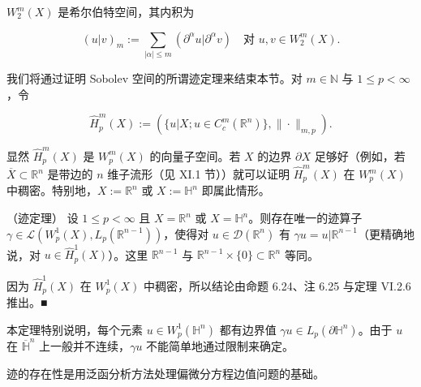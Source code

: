 \begin{corollary}

$ W_2^m(X) $ 是希尔伯特空间，其内积为

\[
(u|v)_m := \sum_{|\alpha|\le m} (\partial^\alpha u|\partial^\alpha v) \quad \text{对 } u, v \in W_2^m(X) .
\]

我们将通过证明 Sobolev 空间的所谓迹定理来结束本节。对 $ m \in \mathbb{N} $ 与 $ 1 \le p < \infty $，令

\[
\widehat{H}_p^m(X) := ( \{ u|X ; u \in C_c^m(\mathbb{R}^n) \}, \|\cdot\|_{m,p} ) .
\]

显然 $ \widehat{H}_p^m(X) $ 是 $ W_p^m(X) $ 的向量子空间。若 $ X $ 的边界 $ \partial X $ 足够好（例如，若 $ \overline{X} \subset \mathbb{R}^n $ 是带边的 $ n $ 维子流形（见 XI.1 节））就可以证明 $ \widehat{H}_p^m(X) $ 在 $ W_p^m(X) $ 中稠密。特别地，$ X := \mathbb{R}^n $ 或 $ X := \mathbb{H}^n $ 即属此情形。

\end{corollary}

\begin{theorem}

（迹定理） 设 $ 1 \le p < \infty $ 且 $ X = \mathbb{R}^n $ 或 $ X = \mathbb{H}^n $。则存在唯一的迹算子 $ \gamma \in \mathcal{L}(W_p^1(X), L_p(\mathbb{R}^{n-1})) $，使得对 $ u \in \mathcal{D}(\mathbb{R}^n) $ 有 $ \gamma u = u|\mathbb{R}^{n-1} $（更精确地说，对 $ u \in \widehat{H}_p^1(X) $）。这里 $ \mathbb{R}^{n-1} $ 与 $ \mathbb{R}^{n-1} \times \{0\} \subset \mathbb{R}^n $ 等同。

\proofhead
因为 $ \widehat{H}_p^1(X) $ 在 $ W_p^1(X) $ 中稠密，所以结论由命题 6.24、注 6.25 与定理 VI.2.6 推出。\nobreak\hspace{0.35em}■
\end{theorem}

本定理特别说明，每个元素 $ u \in W_p^1(\mathbb{H}^n) $ 都有边界值 $ \gamma u \in L_p(\partial\mathbb{H}^n) $。由于 $ u $ 在 $ \overline{\mathbb{H}}^n $ 上一般并不连续，$ \gamma u $ 不能简单地通过限制来确定。

迹的存在性是用泛函分析方法处理偏微分方程边值问题的基础。

\exerciseshead

